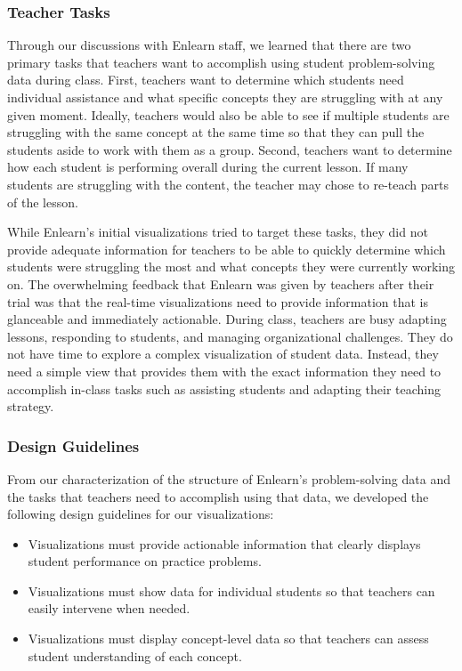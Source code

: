 \documentclass{sigchi}
\begin{document}
\subsubsection{Teacher Tasks}
Through our discussions with Enlearn staff, we learned that there are two primary tasks that teachers want to accomplish using student problem-solving data during class. First, teachers want to determine which students need individual assistance and what specific concepts they are struggling with at any given moment. Ideally, teachers would also be able to see if multiple students are struggling with the same concept at the same time so that they can pull the students aside to work with them as a group. Second, teachers want to determine how each student is performing overall during the current lesson. If many students are struggling with the content, the teacher may chose to re-teach parts of the lesson.

While Enlearn's initial visualizations tried to target these tasks, they did not provide adequate information for teachers to be able to quickly determine which students were struggling the most and what concepts they were currently working on. The overwhelming feedback that Enlearn was given by teachers after their trial was that the real-time visualizations need to provide information that is glanceable and immediately actionable. During class, teachers are busy adapting lessons, responding to students, and managing organizational challenges. They do not have time to explore a complex visualization of student data. Instead, they need a simple view that provides them with the exact information they need to accomplish in-class tasks such as assisting students and adapting their teaching strategy.

\subsubsection{Design Guidelines}
From our characterization of the structure of Enlearn's problem-solving data and the tasks that teachers need to accomplish using that data, we developed the following design guidelines for our visualizations:

\begin{itemize} \itemsep5pt \parskip0pt 
  \item Visualizations must provide actionable information that clearly displays student performance on practice problems.
  \item Visualizations must show data for individual students so that teachers can easily intervene when needed.
  \item Visualizations must display concept-level data so that teachers can assess student understanding of each concept.
\end{itemize}
\end{document}
